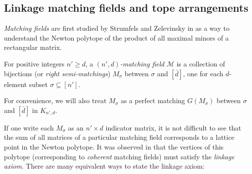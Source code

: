 \documentclass[letterpaper,reqno,11pt]{amsart}
\begin{document}
\subsection{Linkage matching fields and tope arrangements}

\emph{Matching fields} are first studied by Strumfels and Zelevinsky in \cite{MaxMinors} as a way to understand the Newton polytope of the product of all maximal minors of a rectangular matrix.

\begin{definition}
    For positive integers $n' \geq d$, a \emph{$(n', d)$-matching field} $\mathcal{M}$ is a collection of bijections (or \emph{right semi-matchings}) $M_\sigma$ between $\sigma$ and $[\bar{d}]$, one for each $d$-element subset $\sigma\subseteq [n']$. 

    For convenience, we will also treat $M_\sigma$ as a perfect matching $G(M_\sigma)$ between $\sigma$ and $[\bar{d}]$ in $K_{n', d}$.
\end{definition}

If one write each $M_\sigma$ as an $n'\times d$ indicator matrix, it is not difficult to see that the sum of all matrices of a particular matching field corresponds to a lattice point in the Newton polytope. It was observed in \cite{MaxMinors} that the vertices of this polytope (corresponding to \emph{coherent} matching fields) must satisfy the \emph{linkage axiom}. There are many equivalent ways to state the linkage axiom:
\end{document}
